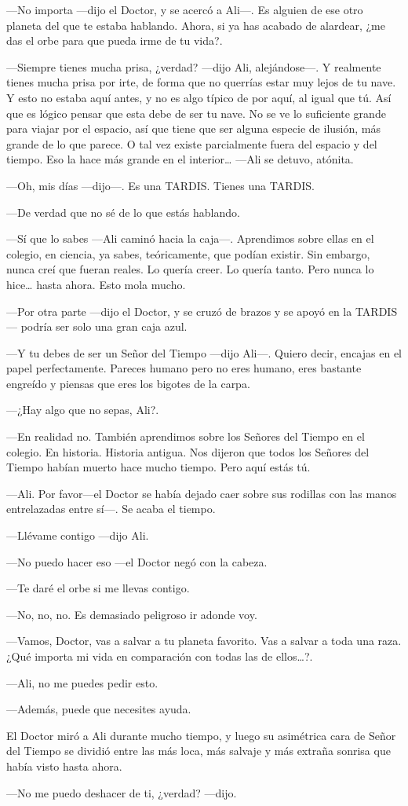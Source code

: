 ---No importa ---dijo el Doctor, y se acercó a Ali---. Es alguien de ese
otro planeta del que te estaba hablando. Ahora, si ya has acabado de
alardear, ¿me das el orbe para que pueda irme de tu vida?.

---Siempre tienes mucha prisa, ¿verdad? ---dijo Ali, alejándose---. Y
realmente tienes mucha prisa por irte, de forma que no querrías estar
muy lejos de tu nave. Y esto no estaba aquí antes, y no es algo típico
de por aquí, al igual que tú. Así que es lógico pensar que esta debe de
ser tu nave. No se ve lo suficiente grande para viajar por el espacio,
así que tiene que ser alguna especie de ilusión, más grande de lo que
parece. O tal vez existe parcialmente fuera del espacio y del tiempo.
Eso la hace más grande en el interior\ldots{} ---Ali se detuvo, atónita.

---Oh, mis días ---dijo---. Es una TARDIS. Tienes una TARDIS.

---De verdad que no sé de lo que estás hablando.

---Sí que lo sabes ---Ali caminó hacia la caja---. Aprendimos sobre
ellas en el colegio, en ciencia, ya sabes, teóricamente, que podían
existir. Sin embargo, nunca creí que fueran reales. Lo quería creer. Lo
quería tanto. Pero nunca lo hice\ldots{} hasta ahora. Esto mola mucho.

---Por otra parte ---dijo el Doctor, y se cruzó de brazos y se apoyó en
la TARDIS--- podría ser solo una gran caja azul.

---Y tu debes de ser un Señor del Tiempo ---dijo Ali---. Quiero decir,
encajas en el papel perfectamente. Pareces humano pero no eres humano,
eres bastante engreído y piensas que eres los bigotes de la carpa.

---¿Hay algo que no sepas, Ali?.

---En realidad no. También aprendimos sobre los Señores del Tiempo en el
colegio. En historia. Historia antigua. Nos dijeron que todos los
Señores del Tiempo habían muerto hace mucho tiempo. Pero aquí estás tú.

---Ali. Por favor---el Doctor se había dejado caer sobre sus rodillas
con las manos entrelazadas entre sí---. Se acaba el tiempo.

---Llévame contigo ---dijo Ali.

---No puedo hacer eso ---el Doctor negó con la cabeza.

---Te daré el orbe si me llevas contigo.

---No, no, no. Es demasiado peligroso ir adonde voy.

---Vamos, Doctor, vas a salvar a tu planeta favorito. Vas a salvar a
toda una raza. ¿Qué importa mi vida en comparación con todas las de
ellos\ldots{}?.

---Ali, no me puedes pedir esto.

---Además, puede que necesites ayuda.

El Doctor miró a Ali durante mucho tiempo, y luego su asimétrica cara de
Señor del Tiempo se dividió entre las más loca, más salvaje y más
extraña sonrisa que había visto hasta ahora.

---No me puedo deshacer de ti, ¿verdad? ---dijo.